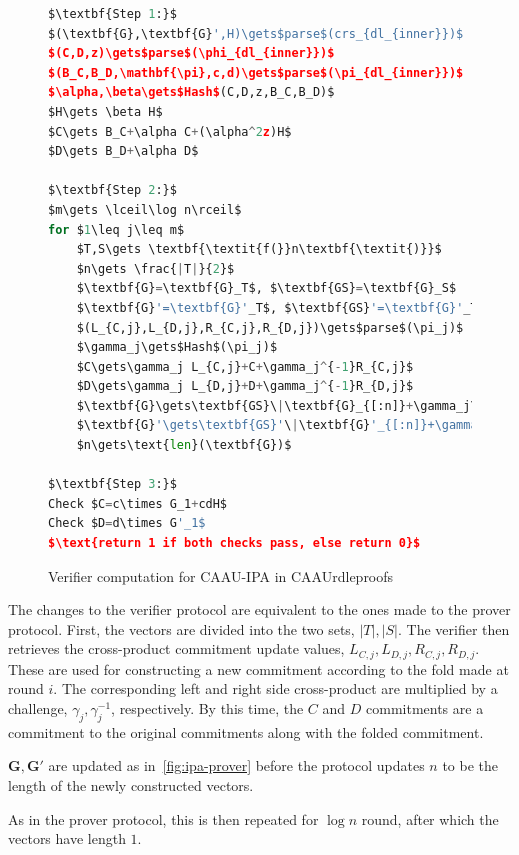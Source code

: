 \begin{figure}[h]
\begin{framed}
\begin{lstlisting}[language=Python,mathescape=true,label={lst:ipa-verifier}]
$\textbf{Step 1:}$
$(\textbf{G},\textbf{G}',H)\gets$parse$(crs_{dl_{inner}})$
$(C,D,z)\gets$parse$(\phi_{dl_{inner}})$
$(B_C,B_D,\mathbf{\pi},c,d)\gets$parse$(\pi_{dl_{inner}})$
$\alpha,\beta\gets$Hash$(C,D,z,B_C,B_D)$
$H\gets \beta H$
$C\gets B_C+\alpha C+(\alpha^2z)H$
$D\gets B_D+\alpha D$

$\textbf{Step 2:}$
$m\gets \lceil\log n\rceil$
for $1\leq j\leq m$
    $T,S\gets \textbf{\textit{f(}}n\textbf{\textit{)}}$
    $n\gets \frac{|T|}{2}$
    $\textbf{G}=\textbf{G}_T$, $\textbf{GS}=\textbf{G}_S$
    $\textbf{G}'=\textbf{G}'_T$, $\textbf{GS}'=\textbf{G}'_T$
    $(L_{C,j},L_{D,j},R_{C,j},R_{D,j})\gets$parse$(\pi_j)$
    $\gamma_j\gets$Hash$(\pi_j)$
    $C\gets\gamma_j L_{C,j}+C+\gamma_j^{-1}R_{C,j}$
    $D\gets\gamma_j L_{D,j}+D+\gamma_j^{-1}R_{D,j}$
    $\textbf{G}\gets\textbf{GS}\|\textbf{G}_{[:n]}+\gamma_j\textbf{G}_{[n:]}$
    $\textbf{G}'\gets\textbf{GS}'\|\textbf{G}'_{[:n]}+\gamma_j^{-1}\textbf{G}'_{[n:]}$
    $n\gets\text{len}(\textbf{G})$

$\textbf{Step 3:}$
Check $C=c\times G_1+cdH$
Check $D=d\times G'_1$
$\text{return 1 if both checks pass, else return 0}$
\end{lstlisting}
\end{framed}
\caption{Verifier computation for CAAU-IPA in CAAUrdleproofs}
\label{fig:ipa-verifier}
\end{figure}

The changes to the verifier protocol are equivalent to the ones made to the prover protocol.
First, the vectors are divided into the two sets, $|T|,|S|$.
The verifier then retrieves the cross-product commitment update values, $L_{C,j},L_{D,j},R_{C,j},R_{D,j}$.
These are used for constructing a new commitment according to the fold made at round $i$.
The corresponding left and right side cross-product are multiplied by a challenge, $\gamma_j,\gamma_j^{-1}$, respectively.
By this time, the $C$ and $D$ commitments are a commitment to the original commitments along with the folded commitment.

$\mathbf{G,G'}$ are updated as in~\autoref{fig:ipa-prover} before the protocol updates $n$ to be the length of the newly constructed vectors.

As in the prover protocol, this is then repeated for $\log n$ round, after which the vectors have length $1$.

